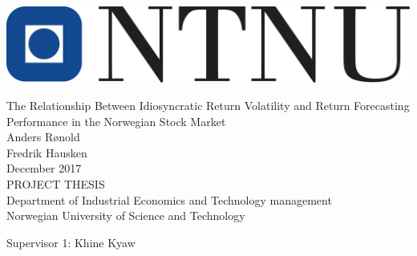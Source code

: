 \thispagestyle{empty}
\includegraphics[scale=0.4]{Pictures/ntnu.png}
\mbox{}\\[6pc]
\begin{center}
\Huge{The Relationship Between Idiosyncratic Return Volatility and Return Forecasting Performance in the Norwegian Stock Market}\\[2pc]

\Large{Anders Rønold \\ Fredrik Hausken}\\[1pc]
\large{December 2017}\\[2pc]

PROJECT THESIS\\
Department of Industrial Economics and Technology management\\
Norwegian University of Science and Technology
\end{center}
\vfill

\noindent Supervisor 1: Khine Kyaw


